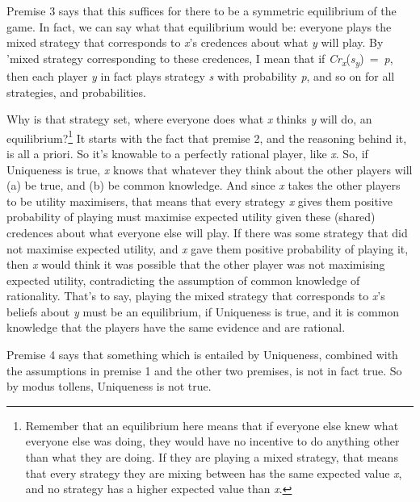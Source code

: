 \documentclass[
  10pt,
  letterpaper,
  DIV=11,
  numbers=noendperiod,
  twoside]{scrartcl}
\begin{document}
Premise 3 says that this suffices for there to be a symmetric
equilibrium of the game. In fact, we can say what that equilibrium would
be: everyone plays the mixed strategy that corresponds to \emph{x}'s
credences about what \emph{y} will play. By 'mixed strategy
corresponding to these credences, I mean that if
\emph{Cr\textsubscript{x}}(\emph{s\textsubscript{y}})~=~\emph{p}, then
each player \emph{y} in fact plays strategy \emph{s} with probability
\emph{p}, and so on for all strategies, and probabilities.

Why is that strategy set, where everyone does what \emph{x} thinks
\emph{y} will do, an equilibrium?\footnote{Remember that an equilibrium
  here means that if everyone else knew what everyone else was doing,
  they would have no incentive to do anything other than what they are
  doing. If they are playing a mixed strategy, that means that every
  strategy they are mixing between has the same expected value \emph{x},
  and no strategy has a higher expected value than \emph{x}.} It starts
with the fact that premise 2, and the reasoning behind it, is all a
priori. So it's knowable to a perfectly rational player, like \emph{x}.
So, if Uniqueness is true, \emph{x} knows that whatever they think about
the other players will (a) be true, and (b) be common knowledge. And
since \emph{x} takes the other players to be utility maximisers, that
means that every strategy \emph{x} gives them positive probability of
playing must maximise expected utility given these (shared) credences
about what everyone else will play. If there was some strategy that did
not maximise expected utility, and \emph{x} gave them positive
probability of playing it, then \emph{x} would think it was possible
that the other player was not maximising expected utility, contradicting
the assumption of common knowledge of rationality. That's to say,
playing the mixed strategy that corresponds to \emph{x}'s beliefs about
\emph{y} must be an equilibrium, if Uniqueness is true, and it is common
knowledge that the players have the same evidence and are rational.

Premise 4 says that something which is entailed by Uniqueness, combined
with the assumptions in premise 1 and the other two premises, is not in
fact true. So by modus tollens, Uniqueness is not true.
\end{document}
